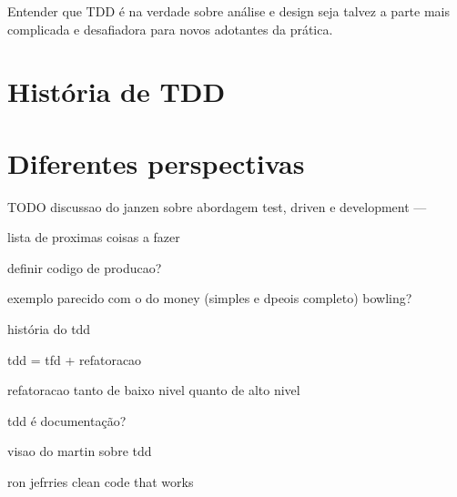 Entender que TDD é na verdade sobre análise e design seja talvez a parte mais complicada e desafiadora para novos adotantes da prática. 

\section{História de TDD}

\section{Diferentes perspectivas}

TODO discussao do janzen sobre abordagem test, driven e development
---



lista de proximas coisas a fazer

definir codigo de producao?

exemplo parecido com o do money (simples e dpeois completo) bowling?

história do tdd

tdd = tfd + refatoracao

refatoracao tanto de baixo nivel quanto de alto nivel

tdd é documentação?

visao do martin sobre tdd

ron jefrries clean code that works

